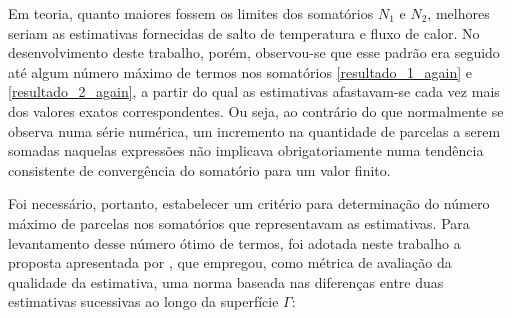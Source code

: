 Em teoria, quanto maiores fossem os limites dos somatórios $N_1$ e $N_2$, melhores seriam as estimativas fornecidas de salto de temperatura e fluxo de calor. No desenvolvimento deste trabalho, porém, observou-se que esse padrão era seguido até algum número máximo de termos nos somatórios \eqref{resultado_1_again} e \eqref{resultado_2_again}, a partir do qual as estimativas afastavam-se cada vez mais dos valores exatos correspondentes. Ou seja, ao contrário do que normalmente se observa numa série numérica, um incremento na quantidade de parcelas a serem somadas naquelas expressões não implicava obrigatoriamente numa tendência consistente de convergência do somatório para um valor finito.

Foi necessário, portanto, estabelecer um critério para determinação do número máximo de parcelas nos somatórios que representavam as estimativas. Para levantamento desse número ótimo de termos, foi adotada neste trabalho a proposta apresentada por \cite{tese_padilha}, que empregou, como métrica de avaliação da qualidade da estimativa, uma norma baseada nas diferenças entre duas estimativas sucessivas ao longo da superfície $\Gamma$:

